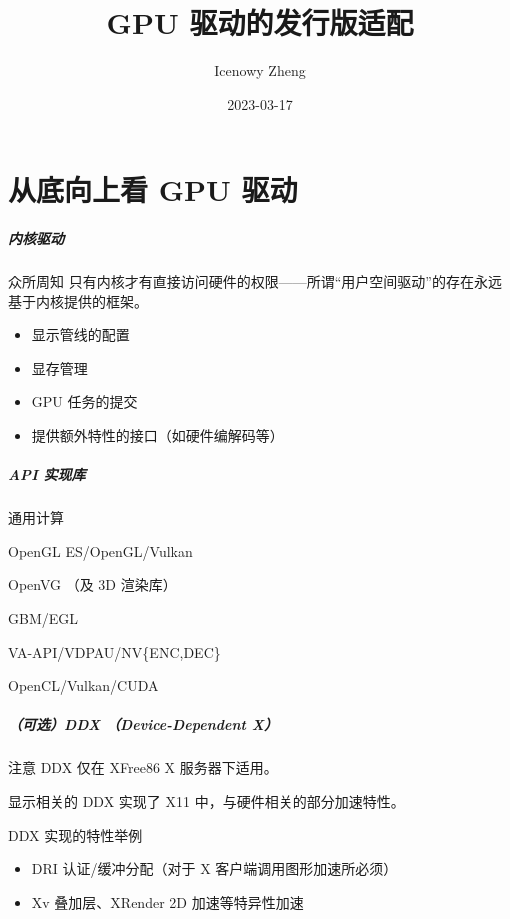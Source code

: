 \documentclass{ctexbeamer}
\title{GPU 驱动的发行版适配}
\author{Icenowy Zheng}
\institute{PLCT 实验室}
\date{2023-03-17}
\begin{document}
\frame{\titlepage}

\part{从底向上看 GPU 驱动}
\frame{\partpage}

\begin{frame}
    \frametitle{内核驱动}
    \begin{block}{众所周知}
        只有内核才有直接访问硬件的权限——所谓“用户空间驱动”的存在永远基于内核提供的框架。
    \end{block}
    \begin{itemize}
        \item 显示管线的配置
        \item 显存管理
        \item GPU 任务的提交
        \item 提供额外特性的接口（如硬件编解码等）
    \end{itemize}
\end{frame}

\begin{frame}
    \frametitle{API 实现库}
    \begin{labeling}{通用计算}
        \item [3D 渲染] OpenGL ES/OpenGL/Vulkan
        \item [2D 渲染] OpenVG （及 3D 渲染库）
        \item [资源管理] GBM/EGL
        \item [硬件解码] VA-API/VDPAU/NV\{ENC,DEC\}
        \item [通用计算] OpenCL/Vulkan/CUDA
    \end{labeling}
\end{frame}

\begin{frame}
    \frametitle{（可选）DDX （Device-Dependent X）}
    \begin{alertblock}{注意}
        DDX 仅在 XFree86 X 服务器下适用。
    \end{alertblock}
    显示相关的 DDX 实现了 X11 中，与硬件相关的部分加速特性。
    \begin{block}{DDX 实现的特性举例}
        \begin{itemize}
            \item DRI 认证/缓冲分配（对于 X 客户端调用图形加速所必须）
            \item Xv 叠加层、XRender 2D 加速等特异性加速
        \end{itemize}
    \end{block}
\end{frame}
\end{document}
